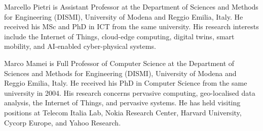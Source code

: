\documentclass[]{interact}
\begin{document}
Marcello Pietri is Assistant Professor at the Department of Sciences and Methods for Engineering (DISMI), University of Modena and Reggio Emilia, Italy. He received his MSc and PhD in ICT from the same university. His research interests include the Internet of Things, cloud-edge computing, digital twins, smart mobility, and AI-enabled cyber-physical systems.

Marco Mamei is Full Professor of Computer Science at the Department of Sciences and Methods for Engineering (DISMI), University of Modena and Reggio Emilia, Italy. He received his PhD in Computer Science from the same university in 2004. His research concerns pervasive computing, geo-localised data analysis, the Internet of Things, and pervasive systems. He has held visiting positions at Telecom Italia Lab, Nokia Research Center, Harvard University, Cycorp Europe, and Yahoo Research.
\end{document}
